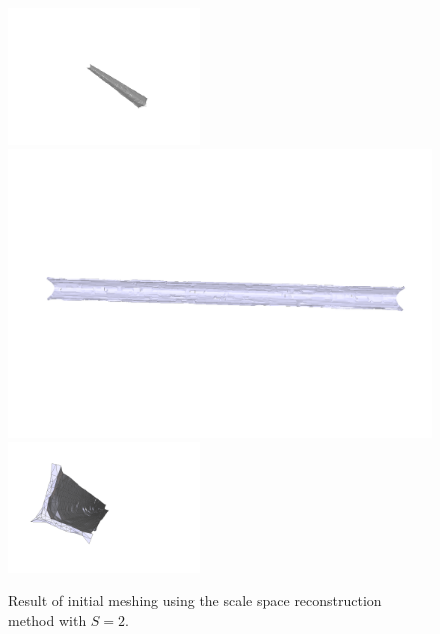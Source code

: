 \documentclass[12pt]{drexelthesis}
\begin{document}
\begin{figure}[!h]
	\label{zeronoise:scalepspace2}
	\centering
		\includegraphics[trim={5in 2in 3in 3in},clip,width=2in]{simulated-lab-scan/0noise/clean/scale200.png}
		\includegraphics[width=6in]{simulated-lab-scan/0noise/clean/scalespace201.png}
		\includegraphics[width=2in]{simulated-lab-scan/0noise/clean/scalespace202.png}
		\caption[Initial meshing using a scale space reconstruction with $S = 2$]{\centering  Result of initial meshing using the scale space reconstruction method with $S = 2$.}
\end{figure}
\end{document}
